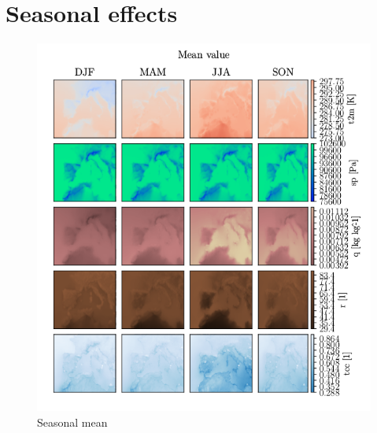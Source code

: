 \cleardoublepage
\chapter{Seasonal effects} \label{app:seasonal_plots}
\begin{figure}[ht]
    \centering
    \includegraphics{python_figs/seasonal_mean_all_variables.png}
    \caption{Seasonal mean}
    \label{fig:seasonal_mean}
\end{figure}

